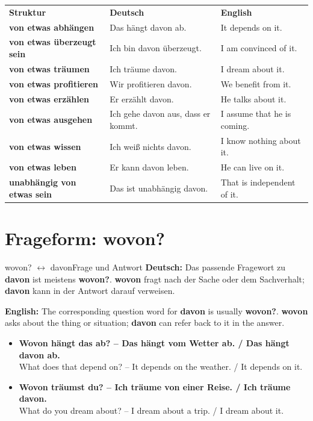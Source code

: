 \documentclass[a4paper,11pt]{article}
\newcommand{\GermanText}[1]{\textbf{Deutsch: }#1\par}
\newcommand{\EnglishText}[1]{{\small\color{SoftGray}\textbf{English: }#1\par}}
\newcommand{\ExampleItem}[2]{\item \textbf{#1}\\{\small\color{SoftGray}#2}}
\begin{document}
        \begin{longtable}{>{\bfseries}p{4.2cm}|p{5.0cm}|p{5.2cm}}
            \rowcolor{HeaderBlueDark}
            \color{white}\textbf{Struktur} &
            \color{white}\textbf{Deutsch} &
            \color{white}\textbf{English} \\
            \textbf{von etwas abhängen} & Das hängt davon ab. & It depends on it. \\
            \textbf{von etwas überzeugt sein} & Ich bin davon überzeugt. & I am convinced of it. \\
            \textbf{von etwas träumen} & Ich träume davon. & I dream about it. \\
            \textbf{von etwas profitieren} & Wir profitieren davon. & We benefit from it. \\
            \textbf{von etwas erzählen} & Er erzählt davon. & He talks about it. \\
            \textbf{von etwas ausgehen} & Ich gehe davon aus, dass er kommt. & I assume that he is coming. \\
            \textbf{von etwas wissen} & Ich weiß nichts davon. & I know nothing about it. \\
            \textbf{von etwas leben} & Er kann davon leben. & He can live on it. \\
            \textbf{unabhängig von etwas sein} & Das ist unabhängig davon. & That is independent of it. \\
        \end{longtable}

    \section{Frageform: wovon?}

        \begin{grammarentry}{wovon? \texorpdfstring{$\leftrightarrow$}{<->} davon}{Frage und Antwort}
            \GermanText{Das passende Fragewort zu \textbf{davon} ist meistens \textbf{wovon?}. \textbf{wovon} fragt nach der Sache oder dem Sachverhalt; \textbf{davon} kann in der Antwort darauf verweisen.}
            \EnglishText{The corresponding question word for \textbf{davon} is usually \textbf{wovon?}. \textbf{wovon} asks about the thing or situation; \textbf{davon} can refer back to it in the answer.}
        \end{grammarentry}

        \begin{exbox}
            \begin{itemize}
                \ExampleItem{Wovon hängt das ab? -- Das hängt vom Wetter ab. / Das hängt davon ab.}{What does that depend on? -- It depends on the weather. / It depends on it.}
                \ExampleItem{Wovon träumst du? -- Ich träume von einer Reise. / Ich träume davon.}{What do you dream about? -- I dream about a trip. / I dream about it.}
            \end{itemize}
        \end{exbox}
\end{document}
